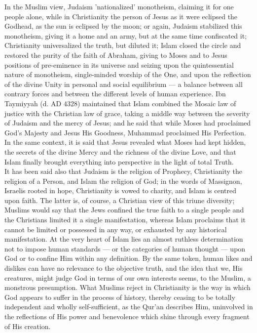\documentclass[11pt, b5paper, twoside]{book}
\begin{document}
In the Muslim view, Judaism 'nationalized' monotheism, claiming it for one people alone, while in 
Christianity the person of Jesus as it were eclipsed the Godhead, as the sun is eclipsed by the moon; 
or again, Judaism stabilized this monotheism, giving it a home and an army, but at the same time 
confiscated it; Christianity universalized the truth, but diluted it; Islam closed the circle and 
restored the purity of the faith of Abraham, giving to Moses and to Jesus positions of pre-eminence 
in its universe and seizing upon the quintessential nature of monotheism, single-minded worship of 
the One, and upon the reflection of the divine Unity in personal and social equilibrium --- a balance 
between all contrary forces and between the different levels of human experience. Ibn Taymiyyah (d. 
AD 4328) maintained that Islam combined the Mosaic law of justice with the Christian law of grace, 
taking a middle way between the severity of Judaism and the mercy of Jesus; and he said that while 
Moses had proclaimed God's Majesty and Jesus His Goodness, Muhammad proclaimed His Perfection. In the 
same context, it is said that Jesus revealed what Moses had kept hidden, the secrets of the divine 
Mercy and the richness of the divine Love, and that Islam finally brought everything into perspective 
in the light of total Truth. \\

It has been said also that Judaism is the religion of Prophecy, Christianity the religion of a 
Person, and Islam the religion of God; in the words of Massignon, Israelis rooted in hope, 
Christianity is vowed to charity, and Islam is centred upon faith. The latter is, of course, a 
Christian view of this triune diversity; Muslims would say that the Jews confined the true faith to a 
single people and the Christians limited it a single manifestation, whereas Islam proclaims that it 
cannot be limited or possessed in any way, or exhausted by any historical manifestation. At the very 
heart of Islam lies an almost ruthless determination not to impose human standards --- or the 
categories of human thought --- upon God or to confine Him within any definition. By the same token, 
human likes and dislikes can have no relevance to the objective truth, and the idea that we, His 
creatures, might judge God in terms of our own interests seems, to the Muslim, a monstrous 
presumption. What Muslims reject in Christianity is the way in which God appears to suffer in the 
process of history, thereby ceasing to be totally independent and wholly self-sufficient, as the 
Qur'an describes Him, uninvolved in the reflections of His power and benevolence which shine through 
every fragment of His creation. \\
\end{document}
